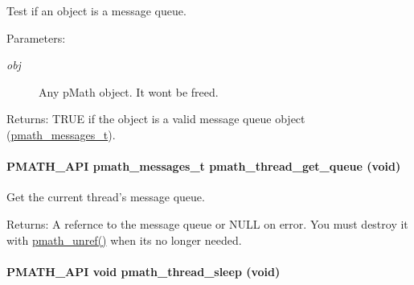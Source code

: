 Test if an object is a message queue. 

\begin{Desc}
\item[Parameters:]
\begin{description}
\item[{\em obj}]Any pMath object. It wont be freed. \end{description}
\end{Desc}
\begin{Desc}
\item[Returns:]TRUE if the object is a valid message queue object (\hyperlink{classpmath__messages__t}{pmath\_\-messages\_\-t}). \end{Desc}
\hypertarget{group__threadmsg_gf4d69db0ffe06846e57df7cadcd3dab6}{
\paragraph[{pmath\_\-thread\_\-get\_\-queue}]{\setlength{\rightskip}{0pt plus 5cm}PMATH\_\-API {\bf pmath\_\-messages\_\-t} pmath\_\-thread\_\-get\_\-queue (void)}\hfill}
\label{group__threadmsg_gf4d69db0ffe06846e57df7cadcd3dab6}


Get the current thread's message queue. 

\begin{Desc}
\item[Returns:]A refernce to the message queue or NULL on error. You must destroy it with \hyperlink{classpmath__t_54e905402c38940687033b87eb8c6c9f}{pmath\_\-unref()} when its no longer needed. \end{Desc}
\hypertarget{group__threadmsg_gce6da6e34b0aeab35094ddccdd9a3e55}{
\paragraph[{pmath\_\-thread\_\-sleep}]{\setlength{\rightskip}{0pt plus 5cm}PMATH\_\-API void pmath\_\-thread\_\-sleep (void)}\hfill}
\label{group__threadmsg_gce6da6e34b0aeab35094ddccdd9a3e55}


